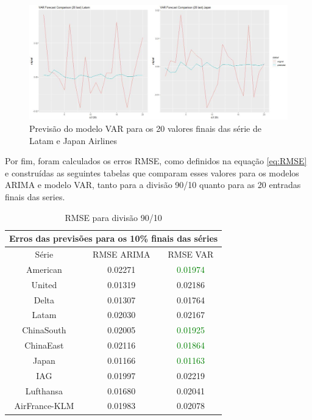 \documentclass[12pt]{article}
\begin{document}
	 \begin{figure}[H]
	 	\centering
	 	\includegraphics[width=1.0\linewidth]{Imagens/VAR_for_20}
	 	\caption{Previsão do modelo VAR para os 20 valores finais das série de Latam e Japan Airlines}
	 	\label{fig:varfor20}
	 \end{figure}
	 
	 Por fim, foram calculados os erros RMSE, como definidos na equação \ref{eq:RMSE} e construídas as seguintes tabelas que comparam esses valores para os modelos ARIMA e modelo VAR, tanto para a divisão 90/10 quanto para as 20 entradas finais das series.
	 
	 \begin{table}[H]\label{tab:RMSE_VAR_all}
	 	\centering
	 	
	 	\begin{tabular}{|c|c|c|}
	 		\hline
	 		\multicolumn{3}{|c|}{Erros das previsões para os 10\% finais das séries} \\ \hline
	 		Série                     & RMSE ARIMA             & RMSE VAR            \\ \hline
	 		American                  & 0.02271                & \textcolor{green}{0.01974}             \\
	 		United                    & 0.01319                & 0.02186             \\
	 		Delta                     & 0.01307                & 0.01764             \\
	 		Latam                     & 0.02030                & 0.02167             \\
	 		ChinaSouth                & 0.02005                & \textcolor{green}{0.01925}             \\
	 		ChinaEast                 & 0.02116                & \textcolor{green}{0.01864}             \\
	 		Japan                     & 0.01166                & \textcolor{green}{0.01163}             \\
	 		IAG                       & 0.01997                & 0.02219             \\
	 		Lufthansa                 & 0.01680                & 0.02041             \\
	 		AirFrance-KLM             & 0.01983                & 0.02078             \\ \hline
	 	\end{tabular}
 		\caption{RMSE para divisão 90/10}
	 \end{table}
\end{document}
